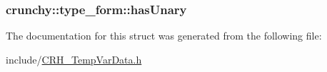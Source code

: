 \subsubsection[{has\+Unary}]{ crunchy\+::type\+\_\+form\+::has\+Unary}\hypertarget{structcrunchy_1_1type__form_a78a0fdae7e17412ea3a5374fa7d0925c}{}\label{structcrunchy_1_1type__form_a78a0fdae7e17412ea3a5374fa7d0925c}


The documentation for this struct was generated from the following file\+:\begin{DoxyCompactItemize}
\item 
include/\hyperlink{_c_r_h___temp_var_data_8h}{C\+R\+H\+\_\+\+Temp\+Var\+Data.\+h}\end{DoxyCompactItemize}
